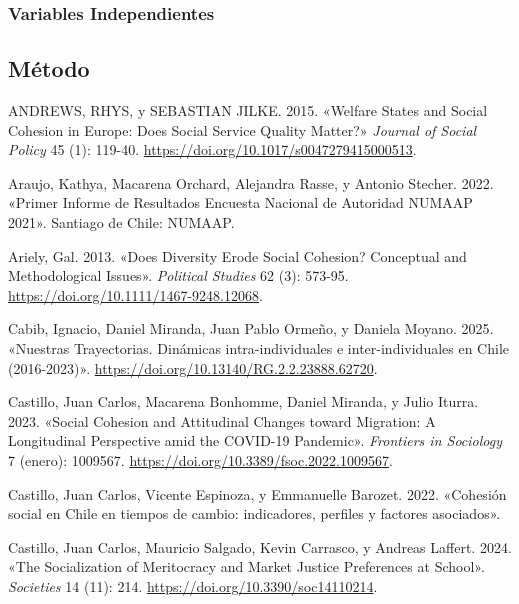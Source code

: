 \documentclass[
  letterpaper,
  DIV=11,
  numbers=noendperiod]{scrartcl}
\newlength{\cslhangindent}
\newenvironment{CSLReferences}[2] %
 {\begin{list}{}{%
  \setlength{\itemindent}{0pt}
  \setlength{\leftmargin}{0pt}
  \setlength{\parsep}{0pt}
  \ifodd #1
   \setlength{\leftmargin}{\cslhangindent}
   \setlength{\itemindent}{-1\cslhangindent}
  \fi
  \setlength{\itemsep}{#2\baselineskip}}}
 {\end{list}}
\begin{document}
\subsubsection{Variables Independientes}\label{variables-independientes}

\subsection*{Método}\label{muxe9todo}

\label{refs}
\begin{CSLReferences}{1}{0}
ANDREWS, RHYS, y SEBASTIAN JILKE. 2015. {«Welfare {States} and {Social
Cohesion} in {Europe}: {Does Social Service Quality Matter}?»}
\emph{Journal of Social Policy} 45 (1): 119-40.
\url{https://doi.org/10.1017/s0047279415000513}.

Araujo, Kathya, Macarena Orchard, Alejandra Rasse, y Antonio Stecher.
2022. {«Primer {Informe} de {Resultados Encuesta Nacional} de {Autoridad
NUMAAP} 2021»}. Santiago de Chile: NUMAAP.

Ariely, Gal. 2013. {«Does {Diversity Erode Social Cohesion}?
{Conceptual} and {Methodological Issues}»}. \emph{Political Studies} 62
(3): 573-95. \url{https://doi.org/10.1111/1467-9248.12068}.

Cabib, Ignacio, Daniel Miranda, Juan Pablo Ormeño, y Daniela Moyano.
2025. {«{Nuestras Trayectorias. Din{á}micas intra-individuales e
inter-individuales en Chile (2016-2023)}»}.
\url{https://doi.org/10.13140/RG.2.2.23888.62720}.

Castillo, Juan Carlos, Macarena Bonhomme, Daniel Miranda, y Julio
Iturra. 2023. {«Social Cohesion and Attitudinal Changes toward
Migration: {A} Longitudinal Perspective amid the {COVID-19} Pandemic»}.
\emph{Frontiers in Sociology} 7 (enero): 1009567.
\url{https://doi.org/10.3389/fsoc.2022.1009567}.

Castillo, Juan Carlos, Vicente Espinoza, y Emmanuelle Barozet. 2022.
{«{Cohesi{ó}n social en Chile en tiempos de cambio: indicadores,
perfiles y factores asociados}»}.

Castillo, Juan Carlos, Mauricio Salgado, Kevin Carrasco, y Andreas
Laffert. 2024. {«The {Socialization} of {Meritocracy} and {Market
Justice Preferences} at {School}»}. \emph{Societies} 14 (11): 214.
\url{https://doi.org/10.3390/soc14110214}.


\end{CSLReferences}
\end{document}
